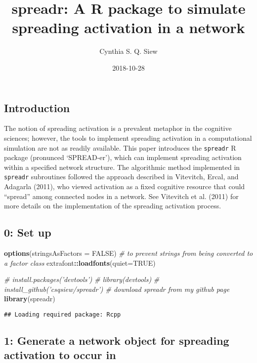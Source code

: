 \documentclass[]{article}
\title{spreadr: A R package to simulate spreading activation in a network}
\author{Cynthia S. Q. Siew}
\date{2018-10-28}
\newenvironment{Shaded}{\begin{snugshade}}{\end{snugshade}}
\newcommand{\KeywordTok}[1]{\textcolor[rgb]{0.13,0.29,0.53}{\textbf{#1}}}
\newcommand{\DataTypeTok}[1]{\textcolor[rgb]{0.13,0.29,0.53}{#1}}
\newcommand{\CommentTok}[1]{\textcolor[rgb]{0.56,0.35,0.01}{\textit{#1}}}
\newcommand{\OtherTok}[1]{\textcolor[rgb]{0.56,0.35,0.01}{#1}}
\newcommand{\OperatorTok}[1]{\textcolor[rgb]{0.81,0.36,0.00}{\textbf{#1}}}
\newcommand{\NormalTok}[1]{#1}
\begin{document}
\maketitle

\subsection{Introduction}\label{introduction}

The notion of spreading activation is a prevalent metaphor in the
cognitive sciences; however, the tools to implement spreading activation
in a computational simulation are not as readily available. This paper
introduces the \texttt{spreadr} R package (pronunced `SPREAD-er'), which
can implement spreading activation within a specified network structure.
The algorithmic method implemented in \texttt{spreadr} subroutines
followed the approach described in Vitevitch, Ercal, and Adagarla
(2011), who viewed activation as a fixed cognitive resource that could
``spread'' among connected nodes in a network. See Vitevitch et al.
(2011) for more details on the implementation of the spreading
activation process.

\subsection{0: Set up}\label{set-up}

\begin{Shaded}
\begin{Highlighting}[]
\KeywordTok{options}\NormalTok{(}\DataTypeTok{stringsAsFactors =} \OtherTok{FALSE}\NormalTok{) }\CommentTok{# to prevent strings from being converted to a factor class}
\NormalTok{extrafont}\OperatorTok{::}\KeywordTok{loadfonts}\NormalTok{(}\DataTypeTok{quiet=}\OtherTok{TRUE}\NormalTok{)}

\CommentTok{# install.packages('devtools')}
\CommentTok{# library(devtools)}
\CommentTok{# install_github('csqsiew/spreadr') # download spreadr from my github page}
\KeywordTok{library}\NormalTok{(spreadr)}
\end{Highlighting}
\end{Shaded}

\begin{verbatim}
## Loading required package: Rcpp
\end{verbatim}

\subsection{1: Generate a network object for spreading activation to
occur
in}\label{generate-a-network-object-for-spreading-activation-to-occur-in}
\end{document}
